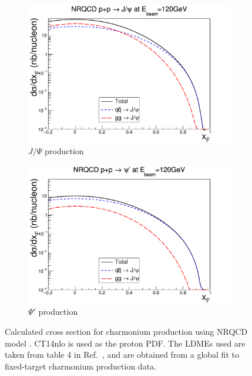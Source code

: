 \begin{figure}[h!]
    \centering
    \begin{subfigure}{0.45\linewidth}
    \includegraphics[width=\linewidth]{images/jpsi_cs_pp}
    \caption{$J/\Psi$ production}
    \end{subfigure}
    \quad
    \begin{subfigure}{0.45\linewidth}
    \includegraphics[width=\linewidth]{images/psip_cs_pp}
    \caption{$\Psi'$ production}
    \end{subfigure}
    \caption{Calculated cross section for charmonium production using NRQCD model
		\cite{chang2021}. CT14nlo is used as the proton PDF. The LDMEs used are
		taken from table \num{4} in Ref.\ \cite{hsieh2021}, and are obtained from a 
		global fit to fixed-target charmonium production data. }
    \label{fig:NRQCD_cs}
\end{figure}


